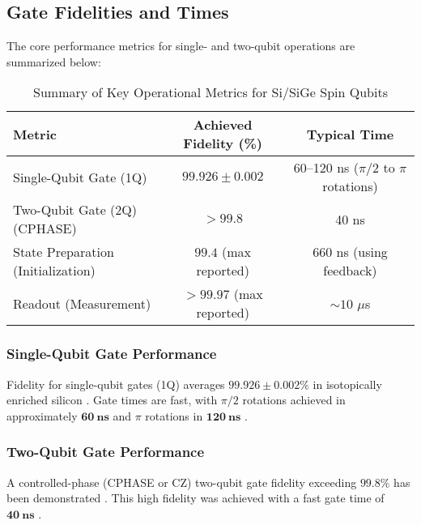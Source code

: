 \subsection{Gate Fidelities and Times}

The core performance metrics for single- and two-qubit operations are summarized below:

\begin{table}[!htb]
    \centering
    \caption{Summary of Key Operational Metrics for Si/SiGe Spin Qubits}
    \label{tab:metrics}
    \begin{tabular}{|l|c|c|}
        \hline
        \textbf{Metric} & \textbf{Achieved Fidelity (\%)} & \textbf{Typical Time} \\
        \hline
        Single-Qubit Gate (1Q) & $99.926 \pm 0.002$ \cite{ref4} & 60--120 ns ($\pi/2$ to $\pi$ rotations) \cite{ref4} \\
        \hline
        Two-Qubit Gate (2Q) (CPHASE) & $> 99.8$ \cite{ref1, ref9} & 40 ns \cite{ref1} \\
        \hline
        State Preparation (Initialization) & $99.4$ (max reported) \cite{ref1} & 660 ns (using feedback) \cite{ref11} \\
        \hline
        Readout (Measurement) & $> 99.97$ (max reported) \cite{ref11} & $\sim 10$ $\mu$s \cite{ref11} \\
        \hline
    \end{tabular}
\end{table}

\subsubsection{Single-Qubit Gate Performance}
Fidelity for single-qubit gates (1Q) averages $\mathbf{99.926 \pm 0.002\%}$ in isotopically enriched silicon \cite{ref4}. Gate times are fast, with $\pi/2$ rotations achieved in approximately $\mathbf{60~ns}$ and $\pi$ rotations in $\mathbf{120~ns}$ \cite{ref4}.

\subsubsection{Two-Qubit Gate Performance}
A controlled-phase (CPHASE or CZ) two-qubit gate fidelity exceeding $\mathbf{99.8\%}$ has been demonstrated \cite{ref1, ref9}. This high fidelity was achieved with a fast gate time of $\mathbf{40~ns}$ \cite{ref1}.

